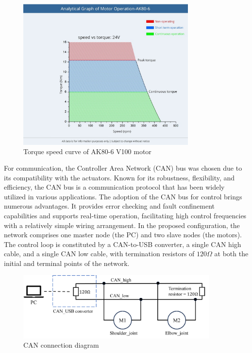 \begin{figure}[H]
  \centering
  \includegraphics[width=0.80\textwidth]{figures/hardware_setup/torque_speed_curve.jpg}
  \caption{Torque speed curve of AK80-6 V100 motor\cite{cubemarsAK806}}
  \label{fig:torque_speed_curve}
\end{figure}

For communication, the Controller Area Network (CAN) bus was chosen due to its compatibility with the actuators. Known for its robustness, flexibility, and efficiency, the CAN bus is a communication protocol that has been widely utilized in various applications. The adoption of the CAN bus for control brings numerous advantages. It provides error checking and fault confinement capabilities and supports real-time operation, facilitating high control frequencies with a relatively simple wiring arrangement. In the proposed configuration, the network comprises one master node (the PC) and two slave nodes (the motors). The control loop is constituted by a CAN-to-USB converter, a single CAN high cable, and a single CAN low cable, with termination resistors of \(120 \Omega\) at both the initial and terminal points of the network.

\begin{figure}[H]
  \centering
  \includegraphics[width=0.9\textwidth]{figures/hardware_setup/can_connection.png}
  \caption{CAN connection diagram}
  \label{fig:can_connection_diagram}
\end{figure}

